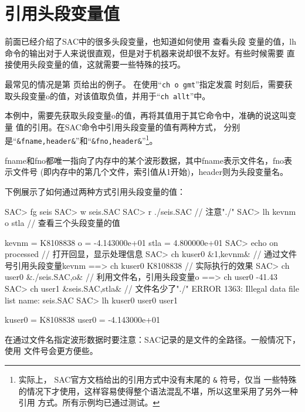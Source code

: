 \section{引用头段变量值}
前面已经介绍了SAC中的很多头段变量，也知道如何使用  查看头段
变量的值，lh命令的输出对于人来说很直观，但是对于机器来说却很不友好。有些时候需要
直接使用头段变量的值，这就需要一些特殊的技巧。

最常见的情况是第 \pageref{code:origin-time} 页给出的例子。
在使用``\texttt{ch o gmt}''指定发震
时刻后，需要获取头段变量o的值，对该值取负值，并用于``\texttt{ch allt}''中。

本例中，需要先获取头段变量o的值，再将其值用于其它命令中，准确的说这叫变量
值的引用。在SAC命令中引用头段变量的值有两种方式，
分别是``\verb|&fname,header&|''和``\verb|&fno,header&|''\footnote{实际上，
SAC官方文档给出的引用方式中没有末尾的 \verb|&| 符号，仅当
一些特殊的情况下才使用，这样容易使得整个语法混乱不堪，所以这里采用了另外一种引用
方式。所有示例均已通过测试。}。

fname和fno都唯一指向了内存中的某个波形数据，其中fname表示文件名，fno表示文件号
(即内存中的第几个文件，索引值从1开始)，header则为头段变量名。

下例展示了如何通过两种方式引用头段变量的值：
\begin{SACCode}
SAC> fg seis
SAC> w seis.SAC
SAC> r ./seis.SAC               // 注意"./"
SAC> lh kevnm o stla            // 查看三个头段变量的值

     kevnm = K8108838
         o = -4.143000e+01
      stla = 4.800000e+01
SAC> echo on processed          // 打开回显，显示处理信息
SAC> ch kuser0 &1,kevnm&        // 通过文件号引用头段变量kevnm
 ==>  ch kuser0 K8108838        // 实际执行的效果
SAC> ch user0 &./seis.SAC,o&    // 利用文件名，引用头段变量o
 ==>  ch user0 -41.43
SAC> ch user1 &seis.SAC,stla&   // 文件名少了"./"
 ERROR 1363: Illegal data file list name: seis.SAC
SAC> lh kuser0 user0 user1

     kuser0 = K8108838
     user0 = -4.143000e+01
\end{SACCode}

在通过文件名指定波形数据时要注意：SAC记录的是文件的全路径。一般情况下，使用
文件号会更方便些。
